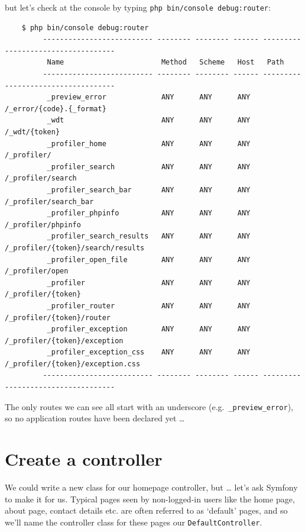 \documentclass[a4paperpaper,openright]{book}
\begin{document}
but let's check at the console by typing
\texttt{php\ bin/console\ debug:router}:

\begin{verbatim}
    $ php bin/console debug:router
         -------------------------- -------- -------- ------ ----------------------------------- 
          Name                       Method   Scheme   Host   Path                               
         -------------------------- -------- -------- ------ ----------------------------------- 
          _preview_error             ANY      ANY      ANY    /_error/{code}.{_format}           
          _wdt                       ANY      ANY      ANY    /_wdt/{token}                      
          _profiler_home             ANY      ANY      ANY    /_profiler/                        
          _profiler_search           ANY      ANY      ANY    /_profiler/search                  
          _profiler_search_bar       ANY      ANY      ANY    /_profiler/search_bar              
          _profiler_phpinfo          ANY      ANY      ANY    /_profiler/phpinfo                 
          _profiler_search_results   ANY      ANY      ANY    /_profiler/{token}/search/results  
          _profiler_open_file        ANY      ANY      ANY    /_profiler/open                    
          _profiler                  ANY      ANY      ANY    /_profiler/{token}                 
          _profiler_router           ANY      ANY      ANY    /_profiler/{token}/router          
          _profiler_exception        ANY      ANY      ANY    /_profiler/{token}/exception       
          _profiler_exception_css    ANY      ANY      ANY    /_profiler/{token}/exception.css   
         -------------------------- -------- -------- ------ ----------------------------------- 
\end{verbatim}

The only routes we can see all start with an underscore
(e.g.~\texttt{\_preview\_error}), so no application routes have been
declared yet \ldots{}

\hypertarget{create-a-controller}{%
\section{Create a controller}\label{create-a-controller}}

We could write a new class for our homepage controller, but \ldots{}
let's ask Symfony to make it for us. Typical pages seen by non-logged-in
users like the home page, about page, contact details etc. are often
referred to as `default' pages, and so we'll name the controller class
for these pages our \texttt{DefaultController}.
\end{document}
